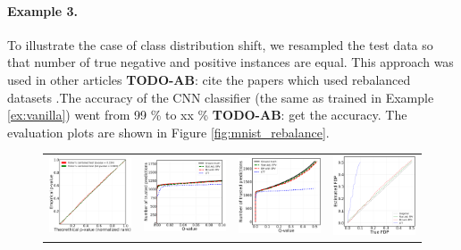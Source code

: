 \documentclass{article}
\newcommand{\todo}[2]{{\color{red} {\bf TODO-#1}: #2}}
\begin{document}
\paragraph{Example 3.} To illustrate the case of class distribution shift, we resampled the test data so that number of true negative and positive instances are equal. This approach was used in other articles \todo{AB}{cite the papers which used rebalanced datasets} \cite{joseph_d__viviano__2019}.The accuracy of the CNN classifier (the same as trained in Example \ref{ex:vanilla}) went from 99 \% to xx \% \todo{AB}{get the accuracy}. The evaluation plots are shown in Figure \ref{fig:mnist_rebalance}.

\begin{figure}[hp]
	\centering
	\begin{tabular}{cccc}
		\includegraphics[width=1.7in]{img/cnn_QQ_balanced.png}&
		\includegraphics[width=1.7in]{img/cnn_balanced_fdr_control_loc.png} &
		\includegraphics[width=1.7in]{img/cnn_balanced_fdr_control.png} & 
		\includegraphics[width=1.7in]{img/cnn_FDPscat_balanced.png} \\		

\end{tabular}
\end{figure}
\end{document}
